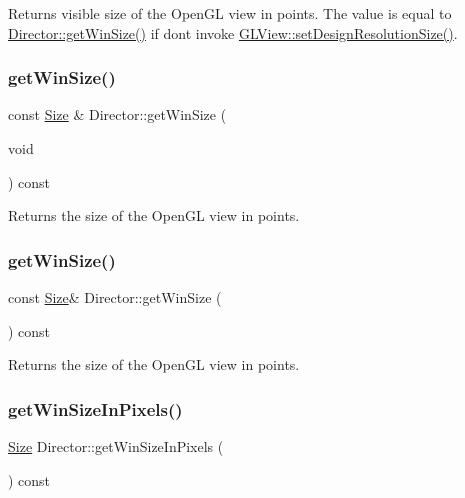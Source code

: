 Returns visible size of the Open\+GL view in points. The value is equal to {\ttfamily \hyperlink{classDirector_af07668df4a8916e6eb0f79a93f6588fe}{Director\+::get\+Win\+Size()}} if don\textquotesingle{}t invoke {\ttfamily \hyperlink{classGLView_a754e253a506c4eb9a923a2a33b4b955c}{G\+L\+View\+::set\+Design\+Resolution\+Size()}}. \mbox{\label{classDirector_af07668df4a8916e6eb0f79a93f6588fe}} 
\subsubsection{\texorpdfstring{get\+Win\+Size()}{getWinSize()}\hspace{0.1cm}{\footnotesize\ttfamily [1/2]}}
{\footnotesize\ttfamily const \hyperlink{classSize}{Size} \& Director\+::get\+Win\+Size (\begin{DoxyParamCaption}\item[{void}]{ }\end{DoxyParamCaption}) const}

Returns the size of the Open\+GL view in points. \mbox{\label{classDirector_a2528d17deb09cec6ee7209127719640c}} 
\subsubsection{\texorpdfstring{get\+Win\+Size()}{getWinSize()}\hspace{0.1cm}{\footnotesize\ttfamily [2/2]}}
{\footnotesize\ttfamily const \hyperlink{classSize}{Size}\& Director\+::get\+Win\+Size (\begin{DoxyParamCaption}{ }\end{DoxyParamCaption}) const}

Returns the size of the Open\+GL view in points. \mbox{\label{classDirector_a2afa5db94fce20cd07c9f4fe57708e21}} 
\subsubsection{\texorpdfstring{get\+Win\+Size\+In\+Pixels()}{getWinSizeInPixels()}\hspace{0.1cm}{\footnotesize\ttfamily [1/2]}}
{\footnotesize\ttfamily \hyperlink{classSize}{Size} Director\+::get\+Win\+Size\+In\+Pixels (\begin{DoxyParamCaption}{ }\end{DoxyParamCaption}) const}

